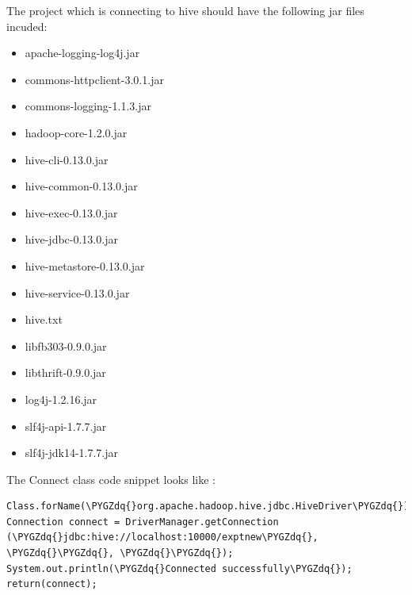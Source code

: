 \documentclass[a4paper,12pt,oneside]{sphinxmanual}
\def\PYGZdq{\char`\"}
\begin{document}
The project which is connecting to hive should have the following jar files incuded:
\begin{itemize}
\item {} 
apache-logging-log4j.jar

\item {} 
commons-httpclient-3.0.1.jar

\item {} 
commons-logging-1.1.3.jar

\item {} 
hadoop-core-1.2.0.jar

\item {} 
hive-cli-0.13.0.jar

\item {} 
hive-common-0.13.0.jar

\item {} 
hive-exec-0.13.0.jar

\item {} 
hive-jdbc-0.13.0.jar

\item {} 
hive-metastore-0.13.0.jar

\item {} 
hive-service-0.13.0.jar

\item {} 
hive.txt

\item {} 
libfb303-0.9.0.jar

\item {} 
libthrift-0.9.0.jar

\item {} 
log4j-1.2.16.jar

\item {} 
slf4j-api-1.7.7.jar

\item {} 
slf4j-jdk14-1.7.7.jar

\end{itemize}

The Connect class code snippet looks like :

\begin{Verbatim}[commandchars=\\\{\}]
Class.forName(\PYGZdq{}org.apache.hadoop.hive.jdbc.HiveDriver\PYGZdq{});
Connection connect = DriverManager.getConnection
(\PYGZdq{}jdbc:hive://localhost:10000/exptnew\PYGZdq{}, \PYGZdq{}\PYGZdq{}, \PYGZdq{}\PYGZdq{});
System.out.println(\PYGZdq{}Connected successfully\PYGZdq{});
return(connect);
\end{Verbatim}
\end{document}
